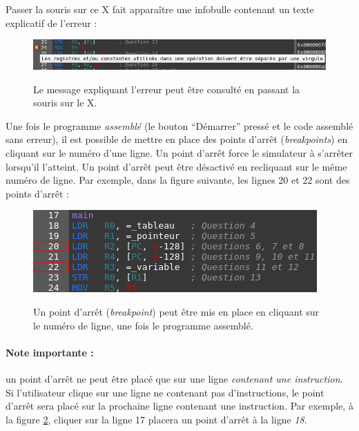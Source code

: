 \documentclass{tufte-handout}
\begin{document}
Passer la souris sur ce X fait apparaître une infobulle contenant un texte explicatif de l'erreur :
\begin{figure}[h!]
\raggedleft
\includegraphics[width=\linewidth]{pics/editeur_err_bulle.png}
\label{f:editeurerrorplus}
\caption{Le message expliquant l'erreur peut être consulté en passant la souris sur le X.}
\end{figure}

Une fois le programme \emph{assemblé} (le bouton ``Démarrer'' pressé et le code assemblé sans erreur), il est possible de mettre en place des points d'arrêt (\textit{breakpoints}) en cliquant sur le numéro d'une ligne. Un point d'arrêt force le simulateur à s'arrêter lorsqu'il l'atteint. Un point d'arrêt peut être désactivé en recliquant sur le même numéro de ligne. Par exemple, dans la figure suivante, les lignes 20 et 22 sont des points d'arrêt :
\begin{figure}[h!]
\raggedleft
\includegraphics[width=0.9\linewidth]{pics/editeur_bkpt.png}
\label{f:editeurbkpt}
\caption{Un point d'arrêt (\textit{breakpoint}) peut être mis en place en cliquant sur le numéro de ligne, une fois le programme assemblé.}
\end{figure}

\paragraph{\textbf{Note importante :}}un point d'arrêt ne peut être placé que sur une ligne \emph{contenant une instruction}. Si l'utilisateur clique sur une ligne ne contenant pas d'instructions, le point d'arrêt sera placé sur la prochaine ligne contenant une instruction. Par exemple, à la figure \ref{f:editeurbkpt}, cliquer sur la ligne 17 placera un point d'arrêt à la ligne \emph{18}.
\end{document}
